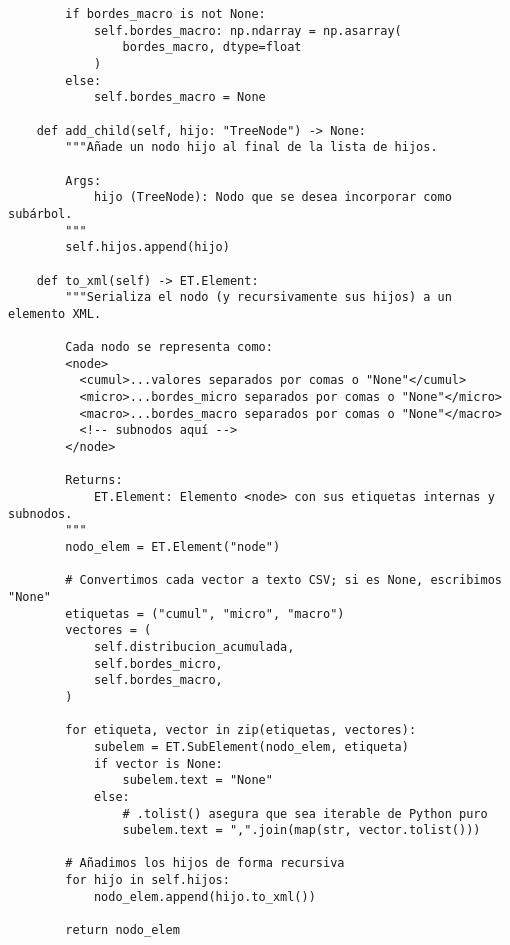 \begin{verbatim}
        if bordes_macro is not None:
            self.bordes_macro: np.ndarray = np.asarray(
                bordes_macro, dtype=float
            )
        else:
            self.bordes_macro = None

    def add_child(self, hijo: "TreeNode") -> None:
        """Añade un nodo hijo al final de la lista de hijos.

        Args:
            hijo (TreeNode): Nodo que se desea incorporar como subárbol.
        """
        self.hijos.append(hijo)

    def to_xml(self) -> ET.Element:
        """Serializa el nodo (y recursivamente sus hijos) a un elemento XML.

        Cada nodo se representa como:
        <node>
          <cumul>...valores separados por comas o "None"</cumul>
          <micro>...bordes_micro separados por comas o "None"</micro>
          <macro>...bordes_macro separados por comas o "None"</macro>
          <!-- subnodos aquí -->
        </node>

        Returns:
            ET.Element: Elemento <node> con sus etiquetas internas y subnodos.
        """
        nodo_elem = ET.Element("node")

        # Convertimos cada vector a texto CSV; si es None, escribimos "None"
        etiquetas = ("cumul", "micro", "macro")
        vectores = (
            self.distribucion_acumulada,
            self.bordes_micro,
            self.bordes_macro,
        )

        for etiqueta, vector in zip(etiquetas, vectores):
            subelem = ET.SubElement(nodo_elem, etiqueta)
            if vector is None:
                subelem.text = "None"
            else:
                # .tolist() asegura que sea iterable de Python puro
                subelem.text = ",".join(map(str, vector.tolist()))

        # Añadimos los hijos de forma recursiva
        for hijo in self.hijos:
            nodo_elem.append(hijo.to_xml())

        return nodo_elem
\end{verbatim}

